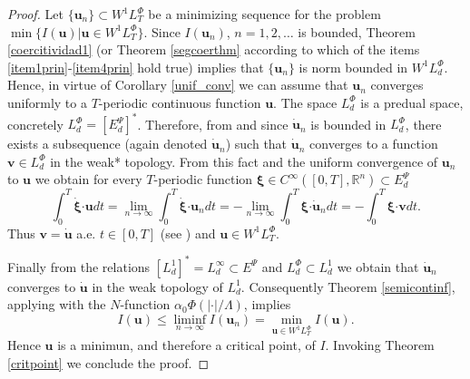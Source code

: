 \documentclass[twoside]{article}
\theoremstyle{remark}
\newcommand{\lphi}{L^{\Phi}}
\newcommand{\wphi}{W^{1}\lphi}
\renewcommand{\b}[1]{\boldsymbol{#1}}
\newcommand{\rr}{\mathbb{R}}
\newcommand{\ccdot}{\b{\cdot}}
\renewcommand{\leq}{\leqslant}
\newcommand{\epsi}{E^{\Psi}}
\begin{document}
\begin{proof} Let $\{\b{u}_n\}\subset \wphi_T$ be a  minimizing sequence for the problem  $\min\{I(\b{u})|\b{u}\in\wphi_T\}$.
Since  $I(\b{u}_n)$, $n=1,2,\ldots$  is bounded, Theorem \ref{coercitividad1} (or Theorem \ref{segcoerthm} according to which of the items \ref{item1prin}-\ref{item4prin} hold true) implies that $\{\b{u}_n\}$ is norm bounded in $\wphi_d$. Hence, in virtue of Corollary \ref{unif_conv} we can assume that $\b{u}_n$ converges uniformly to a $T$-periodic continuous function $\b{u}$.  The space  $\lphi_d$ is a predual space, concretely $\lphi_d=\left[\epsi_d\right]^*$. Therefore, from \cite[Cor. 5, p. 148]{rao1991theory} and since $\b{\dot{u}}_n$ is bounded in $\lphi_d$,  there exists a subsequence (again denoted $\b{\dot{u}}_n$) such that $\b{\dot{u}}_n$ converges to a function $\b{v}\in\lphi_d$ in the weak* topology. From this fact and the uniform convergence of $\b{u}_n$ to $\b{u}$ we obtain for every $T$-periodic function $\b{\xi}\in C^{\infty}([0,T],\rr^n)\subset\epsi_d$
\[\int_0^T\b{\dot{\xi}}\ccdot\b{u}dt=\lim_{n\to\infty}\int_0^T\b{\dot{\xi}}\ccdot\b{u}_ndt=-\lim_{n\to\infty}\int_0^T\b{\xi}\ccdot\b{\dot{u}}_ndt=-\int_0^T\b{\xi}\ccdot\b{v}dt.\]
Thus $\b{v}=\b{\dot{u}}$ a.e. $t\in [0,T]$ (see \cite[p. 6]{mawhin2010critical}) and $\b{u}\in\wphi_T$.

Finally from the relations $\left[L^1_d\right]^*=L^{\infty}_d\subset  \epsi$ and $\lphi_d\subset L^1_d$ we obtain that $\b{\dot{u}}_n$ converges to $\b{\dot{u}}$ in the weak topology of $L^1_d$. Consequently Theorem \ref{semicontinf}, applying with the $N$-function $\alpha_0\Phi\left(|\ccdot|/\Lambda\right)$, implies 
\[I(\b{u})\leq  \liminf_{n\to\infty}I(\b{u}_n)=\min\limits_{\b{u}\in\wphi_T}I(\b{u}).\]
Hence $\b{u}$ is a minimun, and therefore a critical point, of $I$. Invoking Theorem \ref{critpoint} we conclude the proof.\end{proof}

\printbibliography
\end{document}
